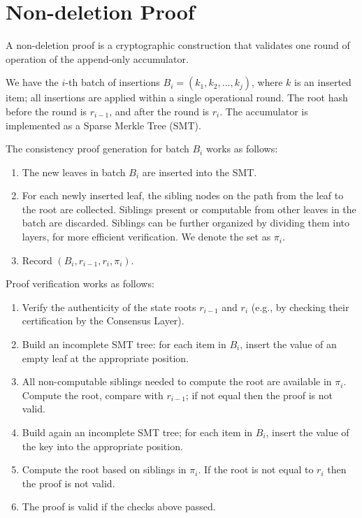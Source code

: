 \documentclass[twocolumn]{article}
\begin{document}
\section{Non-deletion Proof}
\label{sec:consistency-proof}

A non-deletion proof is a cryptographic construction that validates one round of operation of  the append-only accumulator.

We have the $i$-th batch of insertions $B_i = (k_1, k_2, \dots, k_j)$, where $k$ is an inserted item; all insertions are applied within a single operational round. The root hash before the round is $r_{i-1}$, and after the round is $r_i$. The accumulator is implemented as a Sparse Merkle Tree (SMT).

The consistency proof generation for batch $B_i$ works as follows:

\begin{enumerate}
    \item The new leaves in batch $B_i$ are inserted into the SMT.
    \item For each newly inserted leaf, the sibling nodes on the path from the leaf to the root are collected. Siblings present or computable from other leaves in the batch are discarded. Siblings can be further organized by dividing them into layers, for more efficient verification. We denote the set as $\pi_i$.
    \item Record $(B_i, r_{i-1}, r_i, \pi_i)$.
\end{enumerate}

Proof verification works as follows:

\begin{enumerate}
    \item Verify the authenticity of the state roots $r_{i-1}$ and $r_i$ (e.g., by checking their certification by the Consensus Layer).
    \item Build an incomplete SMT tree: for each item in $B_i$, insert the value of an empty leaf at the appropriate position.
    \item All non-computable siblings needed to compute the root are available in $\pi_i$. Compute the root, compare with $r_{i-1}$; if not equal then the proof is not valid.
    \item Build again an incomplete SMT tree; for each item in $B_i$, insert the value of the key into the appropriate position.
    \item Compute the root based on siblings in $\pi_i$. If the root is not equal to $r_i$ then the proof is not valid.
    \item The proof is valid if the checks above passed.
\end{enumerate}
\end{document}
